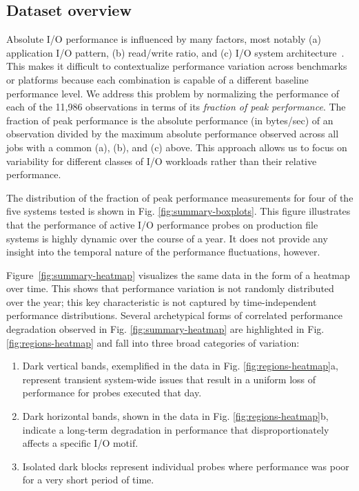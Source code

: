 \subsection{Dataset overview} \label{sec:features/summary}

Absolute I/O performance is influenced by many factors, most notably (a)
application I/O pattern, (b) read/write ratio, and (c) I/O system
architecture~\cite{Lockwood2017, Xie2012}.  This makes it difficult to
contextualize performance variation across benchmarks or platforms
because each combination is capable of a different baseline performance
level.
We address this problem by normalizing the
performance of each of the 11,986 observations in terms of its
\emph{fraction of peak performance}.
The fraction of peak performance is the absolute performance (in
bytes/sec) of an observation divided by the maximum absolute performance
observed across all jobs with a common (a), (b), and (c) above.
This
approach allows us to focus on variability for different classes of I/O
workloads rather than their relative performance.


The distribution of the fraction of peak performance measurements for four
of the five systems tested is shown in Fig. \ref{fig:summary-boxplots}.
This figure illustrates that the performance of active I/O performance
probes on production file systems is highly dynamic over the course of a
year.  It does not provide any insight into the temporal nature of the
performance fluctuations, however.

Figure~\ref{fig:summary-heatmap} visualizes the same data in the form of a
heatmap over time.  This shows that performance variation is not randomly
distributed over the year; this key characteristic is not captured by
time-independent performance distributions.
Several archetypical forms of correlated performance degradation observed in Fig. \ref{fig:summary-heatmap} are highlighted in Fig. \ref{fig:regions-heatmap} and fall into three broad categories of variation:

\begin{enumerate}[leftmargin=*]
\item Dark vertical bands, exemplified in the \mira data in Fig. \ref{fig:regions-heatmap}a, represent transient system-wide issues that result in a uniform loss of performance for probes executed that day.
\item Dark horizontal bands, shown in the \cori data in Fig. \ref{fig:regions-heatmap}b, indicate a long-term degradation in performance that disproportionately affects a specific I/O motif.
\item Isolated dark blocks represent individual probes where performance was poor for a very short period of time.
\end{enumerate}

